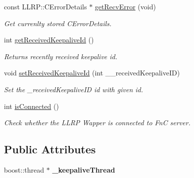 \begin{DoxyCompactItemize}
const L\-L\-R\-P\-::\-C\-Error\-Details $\ast$ \hyperlink{class_e_l_f_i_n_1_1_c_connection_fn_c_mgr_ab2e92f43c03191db481e2270d829186e}{get\-Recv\-Error} (void)
\begin{DoxyCompactList}\small\item\em Get currenlty stored C\-Error\-Details. \end{DoxyCompactList}\item 
int \hyperlink{class_e_l_f_i_n_1_1_c_connection_fn_c_mgr_a0058da7de14d9c84027a46e3bde38d7e}{get\-Received\-Keepalive\-Id} ()
\begin{DoxyCompactList}\small\item\em Returns recently received keepalive id. \end{DoxyCompactList}\item 
void \hyperlink{class_e_l_f_i_n_1_1_c_connection_fn_c_mgr_a248b1ad1d6138f5ade40892f3afb5a68}{set\-Received\-Keepalive\-Id} (int \-\_\-\-\_\-received\-Keepalive\-I\-D)
\begin{DoxyCompactList}\small\item\em Set the \-\_\-received\-Keepalive\-I\-D id with given id. \end{DoxyCompactList}\item 
int \hyperlink{class_e_l_f_i_n_1_1_c_connection_fn_c_mgr_aa27f8bb83349b52dffe670824cfa0e53}{is\-Connected} ()
\begin{DoxyCompactList}\small\item\em Check whether the L\-L\-R\-P Wapper is connected to Fn\-C server. \end{DoxyCompactList}\end{DoxyCompactItemize}
\subsection*{Public Attributes}
\begin{DoxyCompactItemize}
\item 
\hypertarget{class_e_l_f_i_n_1_1_c_connection_fn_c_mgr_a61fa802e7be0de0e84bb6a802abf1ab8}{boost\-::thread $\ast$ {\bfseries \-\_\-keepalive\-Thread}}\label{class_e_l_f_i_n_1_1_c_connection_fn_c_mgr_a61fa802e7be0de0e84bb6a802abf1ab8}

\end{DoxyCompactItemize}
